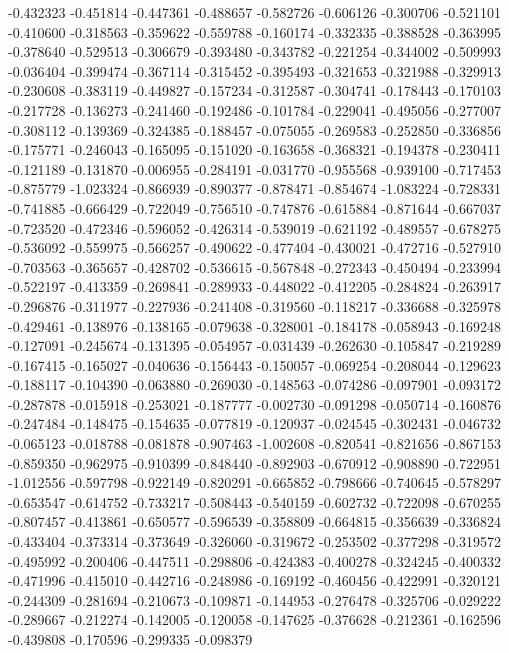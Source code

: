 -0.432323
-0.451814
-0.447361
-0.488657
-0.582726
-0.606126
-0.300706
-0.521101
-0.410600
-0.318563
-0.359622
-0.559788
-0.160174
-0.332335
-0.388528
-0.363995
-0.378640
-0.529513
-0.306679
-0.393480
-0.343782
-0.221254
-0.344002
-0.509993
-0.036404
-0.399474
-0.367114
-0.315452
-0.395493
-0.321653
-0.321988
-0.329913
-0.230608
-0.383119
-0.449827
-0.157234
-0.312587
-0.304741
-0.178443
-0.170103
-0.217728
-0.136273
-0.241460
-0.192486
-0.101784
-0.229041
-0.495056
-0.277007
-0.308112
-0.139369
-0.324385
-0.188457
-0.075055
-0.269583
-0.252850
-0.336856
-0.175771
-0.246043
-0.165095
-0.151020
-0.163658
-0.368321
-0.194378
-0.230411
-0.121189
-0.131870
-0.006955
-0.284191
-0.031770
-0.955568
-0.939100
-0.717453
-0.875779
-1.023324
-0.866939
-0.890377
-0.878471
-0.854674
-1.083224
-0.728331
-0.741885
-0.666429
-0.722049
-0.756510
-0.747876
-0.615884
-0.871644
-0.667037
-0.723520
-0.472346
-0.596052
-0.426314
-0.539019
-0.621192
-0.489557
-0.678275
-0.536092
-0.559975
-0.566257
-0.490622
-0.477404
-0.430021
-0.472716
-0.527910
-0.703563
-0.365657
-0.428702
-0.536615
-0.567848
-0.272343
-0.450494
-0.233994
-0.522197
-0.413359
-0.269841
-0.289933
-0.448022
-0.412205
-0.284824
-0.263917
-0.296876
-0.311977
-0.227936
-0.241408
-0.319560
-0.118217
-0.336688
-0.325978
-0.429461
-0.138976
-0.138165
-0.079638
-0.328001
-0.184178
-0.058943
-0.169248
-0.127091
-0.245674
-0.131395
-0.054957
-0.031439
-0.262630
-0.105847
-0.219289
-0.167415
-0.165027
-0.040636
-0.156443
-0.150057
-0.069254
-0.208044
-0.129623
-0.188117
-0.104390
-0.063880
-0.269030
-0.148563
-0.074286
-0.097901
-0.093172
-0.287878
-0.015918
-0.253021
-0.187777
-0.002730
-0.091298
-0.050714
-0.160876
-0.247484
-0.148475
-0.154635
-0.077819
-0.120937
-0.024545
-0.302431
-0.046732
-0.065123
-0.018788
-0.081878
-0.907463
-1.002608
-0.820541
-0.821656
-0.867153
-0.859350
-0.962975
-0.910399
-0.848440
-0.892903
-0.670912
-0.908890
-0.722951
-1.012556
-0.597798
-0.922149
-0.820291
-0.665852
-0.798666
-0.740645
-0.578297
-0.653547
-0.614752
-0.733217
-0.508443
-0.540159
-0.602732
-0.722098
-0.670255
-0.807457
-0.413861
-0.650577
-0.596539
-0.358809
-0.664815
-0.356639
-0.336824
-0.433404
-0.373314
-0.373649
-0.326060
-0.319672
-0.253502
-0.377298
-0.319572
-0.495992
-0.200406
-0.447511
-0.298806
-0.424383
-0.400278
-0.324245
-0.400332
-0.471996
-0.415010
-0.442716
-0.248986
-0.169192
-0.460456
-0.422991
-0.320121
-0.244309
-0.281694
-0.210673
-0.109871
-0.144953
-0.276478
-0.325706
-0.029222
-0.289667
-0.212274
-0.142005
-0.120058
-0.147625
-0.376628
-0.212361
-0.162596
-0.439808
-0.170596
-0.299335
-0.098379
